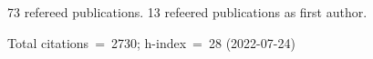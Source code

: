 73 refereed publications. 13 refeered publications as first author.

Total citations~=~2730; h-index~=~28 (2022-07-24)